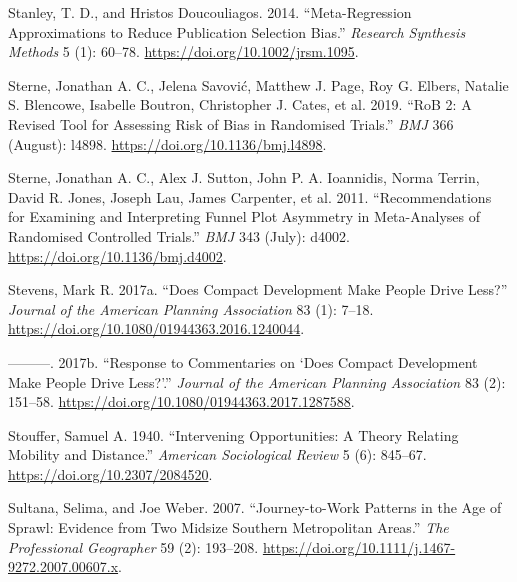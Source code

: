 \documentclass[
  11pt,
  openany]{memoir}
\newlength{\cslhangindent}
\newlength{\cslentryspacingunit} %
\newenvironment{CSLReferences}[2] %
 {%
  \setlength{\parindent}{0pt}
  \ifodd #1
  \let\oldpar\par
  \def\par{\hangindent=\cslhangindent\oldpar}
  \fi
  \setlength{\parskip}{#2\cslentryspacingunit}
 }%
 {}
\begin{document}
\begin{CSLReferences}{1}{0}
\leavevmode{}%
Stanley, T. D., and Hristos Doucouliagos. 2014. {``Meta-Regression Approximations to Reduce Publication Selection Bias.''} \emph{Research Synthesis Methods} 5 (1): 60--78. \url{https://doi.org/10.1002/jrsm.1095}.

\leavevmode{}%
Sterne, Jonathan A. C., Jelena Savović, Matthew J. Page, Roy G. Elbers, Natalie S. Blencowe, Isabelle Boutron, Christopher J. Cates, et al. 2019. {``{RoB} 2: A Revised Tool for Assessing Risk of Bias in Randomised Trials.''} \emph{BMJ} 366 (August): l4898. \url{https://doi.org/10.1136/bmj.l4898}.

\leavevmode{}%
Sterne, Jonathan A. C., Alex J. Sutton, John P. A. Ioannidis, Norma Terrin, David R. Jones, Joseph Lau, James Carpenter, et al. 2011. {``Recommendations for Examining and Interpreting Funnel Plot Asymmetry in Meta-Analyses of Randomised Controlled Trials.''} \emph{BMJ} 343 (July): d4002. \url{https://doi.org/10.1136/bmj.d4002}.

\leavevmode{}%
Stevens, Mark R. 2017a. {``Does {Compact Development Make People Drive Less}?''} \emph{Journal of the American Planning Association} 83 (1): 7--18. \url{https://doi.org/10.1080/01944363.2016.1240044}.

\leavevmode{}%
---------. 2017b. {``Response to {Commentaries} on {`{Does Compact Development Make People Drive Less}?'}.''} \emph{Journal of the American Planning Association} 83 (2): 151--58. \url{https://doi.org/10.1080/01944363.2017.1287588}.

\leavevmode{}%
Stouffer, Samuel A. 1940. {``Intervening {Opportunities}: A {Theory Relating Mobility} and {Distance}.''} \emph{American Sociological Review} 5 (6): 845--67. \url{https://doi.org/10.2307/2084520}.

\leavevmode{}%
Sultana, Selima, and Joe Weber. 2007. {``Journey-to-{Work Patterns} in the {Age} of {Sprawl}: Evidence from {Two Midsize Southern Metropolitan Areas}.''} \emph{The Professional Geographer} 59 (2): 193--208. \url{https://doi.org/10.1111/j.1467-9272.2007.00607.x}.


\end{CSLReferences}
\end{document}
